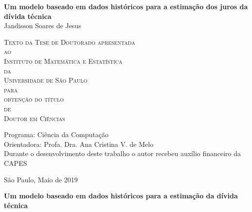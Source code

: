 \documentclass[11pt,twoside,a4paper]{book}
\begin{document}
\frontmatter 
\fancyhead[RO]{{\footnotesize\rightmark}\hspace{2em}\thepage}
\setcounter{tocdepth}{2}
\fancyhead[LE]{\thepage\hspace{2em}\footnotesize{\leftmark}}
\fancyhead[RE,LO]{}
\fancyhead[RO]{{\footnotesize\rightmark}\hspace{2em}\thepage}

\onehalfspacing  %

\thispagestyle{empty}
\begin{center}
    \vspace*{2.3cm}
    \textbf{\Large{Um modelo baseado em dados históricos para a estimação dos juros da dívida técnica}}\\
    
    \vspace*{1.2cm}
    \Large{Jandisson Soares de Jesus}
    
    \vskip 2cm
    \textsc{
    Texto da Tese de Doutorado apresentada\\[-0.25cm] 
    ao\\[-0.25cm]
    Instituto de Matemática e Estatística\\[-0.25cm]
    da\\[-0.25cm]
    Universidade de São Paulo\\[-0.25cm]
    para\\[-0.25cm]
    obtenção do título\\[-0.25cm]
    de\\[-0.25cm]
    Doutor em Ciências}
    
    \vskip 1.5cm
    Programa: Ciência da Computação\\
    Orientadora: Profa. Dra. Ana Cristina V. de Melo\\


   	\vskip 1cm
    \normalsize{Durante o desenvolvimento deste trabalho o autor recebeu auxílio
    financeiro da CAPES}
    
    \vskip 0.5cm
    \normalsize{São Paulo, Maio de 2019}
\end{center}

%
%
%
\newpage
\thispagestyle{empty}
    \begin{center}
        \vspace*{2.3 cm}
        \textbf{\Large{Um modelo baseado em dados históricos para a estimação da dívida técnica}}\\
        \vspace*{2 cm}
    \end{center}
\end{document}
